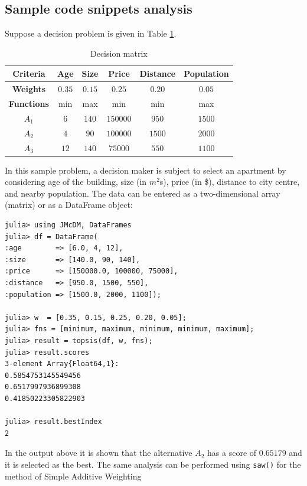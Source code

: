 \documentclass[authoryear,preprint,review,12pt]{elsarticle}
\begin{document}
\subsection{Sample code snippets analysis}
\label{section:sample_code}

Suppose a decision problem is given in Table \ref{table:example_problem}.

\begin{table}[H]
	\centering
	\begin{tabular}{|c|c|c|c|c|c|}
		\hline
		\textbf{Criteria} & {Age} & {Size} &  {Price} & {Distance} & {Population}\\
		\hline
		\textbf{Weights} & {$0.35$} & {$0.15$} & {$0.25$}& {$0.20$} & {$0.05$} \\
		\hline
		\textbf{Functions} & min  & max & min & min & max\\
		\hline
		\hline
		{$A_1$} & {$6$} & {$140$} & $150000$ & {$950$} & $1500$\\
		\hline
		{$A_2$} & {$4$} & {$90$} & $100000$ & {$1500$} & $2000$\\
		\hline
		{$A_3$} & {$12$} & {$140$} & $75000$ & {$550$} & $1100$\\
		\hline
	\end{tabular}
	\caption{Decision matrix}
	\label{table:example_problem} 
\end{table}

In this sample problem, a decision maker is subject to select an apartment by considering age of the building, size (in $m^2$s), price (in \$), distance to city centre, and nearby population.
The data can be entered as a two-dimensional array (matrix) or as a DataFrame object:

\begin{verbatim}
julia> using JMcDM, DataFrames
julia> df = DataFrame(
:age        => [6.0, 4, 12],
:size       => [140.0, 90, 140],
:price      => [150000.0, 100000, 75000],
:distance   => [950.0, 1500, 550],
:population => [1500.0, 2000, 1100]);

julia> w  = [0.35, 0.15, 0.25, 0.20, 0.05];
julia> fns = [minimum, maximum, minimum, minimum, maximum];
julia> result = topsis(df, w, fns);
julia> result.scores
3-element Array{Float64,1}:
0.5854753145549456
0.6517997936899308
0.41850223305822903

julia> result.bestIndex
2
\end{verbatim}

In the output above it is shown that the alternative $A_2$ has a score of $0.65179$ and it is selected as the best. The same analysis can be performed using \texttt{saw()} for the method of Simple Additive Weighting
\end{document}
